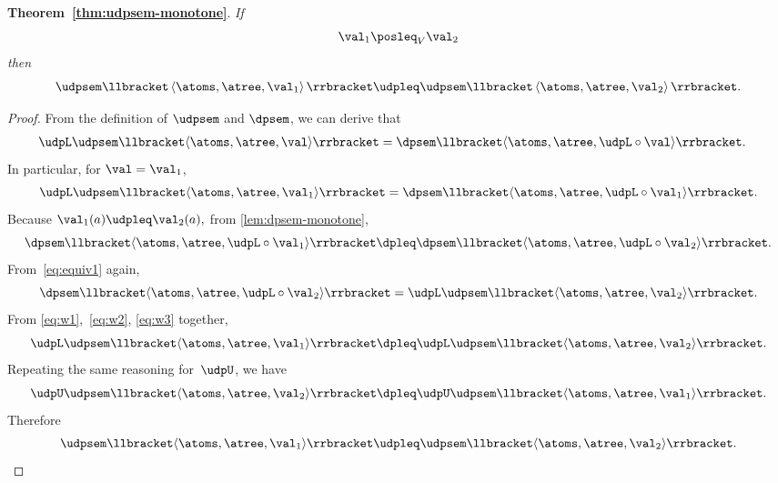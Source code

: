 \textbf{Theorem~\ref{thm:udpsem-monotone}}. \emph{If
  \[
    \val_{1}\posleq_{V}\val_{2}
  \]
  then
  \[
    \udpsem\llbracket\left\langle \atoms,\atree,\val_{1}\right\rangle \rrbracket\udpleq\udpsem\llbracket\left\langle \atoms,\atree,\val_{2}\right\rangle \rrbracket.
  \]
}
\begin{proof}
  From the definition of $\udpsem$ and $\dpsem$, we can derive that
  \begin{align}
    \udpL\udpsem\llbracket\langle\atoms,\atree,\val\rangle\rrbracket & =\dpsem\llbracket\langle\atoms,\atree,\udpL\circ\val\rangle\rrbracket.\label{eq:equiv1}
  \end{align}
  In particular, for $\val=\val_{1}$,
  \begin{equation}
    \udpL\udpsem\llbracket\langle\atoms,\atree,\val_{1}\rangle\rrbracket=\dpsem\llbracket\langle\atoms,\atree,\udpL\circ\val_{1}\rangle\rrbracket.\label{eq:w1}
  \end{equation}
  Because $\val_{1}(a)\udpleq\val_{2}(a),$ from \cref{lem:dpsem-monotone},
  \begin{equation}
    \dpsem\llbracket\langle\atoms,\atree,\udpL\circ\val_{1}\rangle\rrbracket\dpleq\dpsem\llbracket\langle\atoms,\atree,\udpL\circ\val_{2}\rangle\rrbracket.\label{eq:w2}
  \end{equation}
  From~\cref{eq:equiv1} again,
  \begin{equation}
    \dpsem\llbracket\langle\atoms,\atree,\udpL\circ\val_{2}\rangle\rrbracket=\udpL\udpsem\llbracket\langle\atoms,\atree,\val_{2}\rangle\rrbracket.\label{eq:w3}
  \end{equation}
  From \cref{eq:w1},~\cref{eq:w2}, \cref{eq:w3} together,
  \[
    \udpL\udpsem\llbracket\langle\atoms,\atree,\val_{1}\rangle\rrbracket\dpleq\udpL\udpsem\llbracket\langle\atoms,\atree,\val_{2}\rangle\rrbracket.
  \]
  Repeating the same reasoning for~$\udpU$, we have
  \[
    \udpU\udpsem\llbracket\langle\atoms,\atree,\val_{2}\rangle\rrbracket\dpleq\udpU\udpsem\llbracket\langle\atoms,\atree,\val_{1}\rangle\rrbracket.
  \]
  Therefore
  \[
    \udpsem\llbracket\langle\atoms,\atree,\val_{1}\rangle\rrbracket\udpleq\udpsem\llbracket\langle\atoms,\atree,\val_{2}\rangle\rrbracket.
  \]
\end{proof}

\vfill\pagebreak

